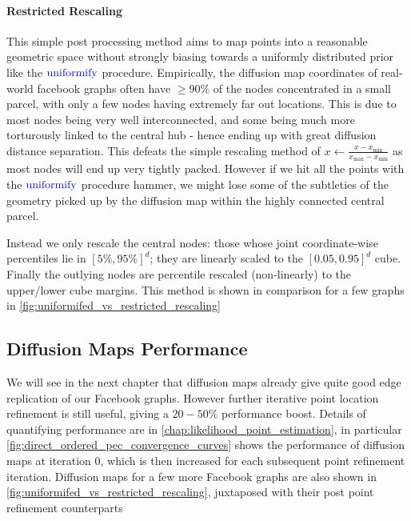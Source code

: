 
\paragraph{Restricted Rescaling} This simple post processing method aims to map points into a reasonable geometric space without strongly biasing towards a uniformly distributed prior like the $\operatorname{\textcolor{blue}{uniformify}}$ procedure.
Empirically, the diffusion map coordinates of real-world facebook graphs often have $\geq 90\%$ of the nodes concentrated in a small parcel, with only a few nodes having extremely far out locations. This is due to most nodes being very well interconnected, and some being much more torturously linked to the central hub - hence ending up with great diffusion distance separation.
This defeats the simple rescaling method of $x \gets \frac{x - x_{\min}}{x_{\max} - x_{\min}}$ as most nodes will end up very tightly packed. However if we hit all the points with the $\operatorname{\textcolor{blue}{uniformify}}$ procedure hammer, we might lose some of the subtleties of the geometry picked up by the diffusion map within the highly connected central parcel.

Instead we only rescale the central nodes: those whose joint coordinate-wise percentiles lie in $[5\%, 95\%]^d$; they are linearly scaled to the $[0.05, 0.95]^d$ cube. Finally the outlying nodes are percentile rescaled (non-linearly) to the upper/lower cube margins.
This method is shown in comparison for a few graphs in \cref{fig:uniformifed_vs_restricted_rescaling}


\subsection{Diffusion Maps Performance}
We will see in the next chapter that diffusion maps already give quite good edge replication of our Facebook graphs. However further iterative point location refinement is still useful, giving a $20-50\%$ performance boost. Details of quantifying performance are in \cref{chap:likelihood_point_estimation}, in particular \cref{fig:direct_ordered_pec_convergence_curves} shows the performance of diffusion maps at iteration $0$, which is then increased for each subsequent point refinement iteration. Diffusion maps for a few more Facebook graphs are also shown in \cref{fig:uniformifed_vs_restricted_rescaling}, juxtaposed with their post point refinement counterparts



